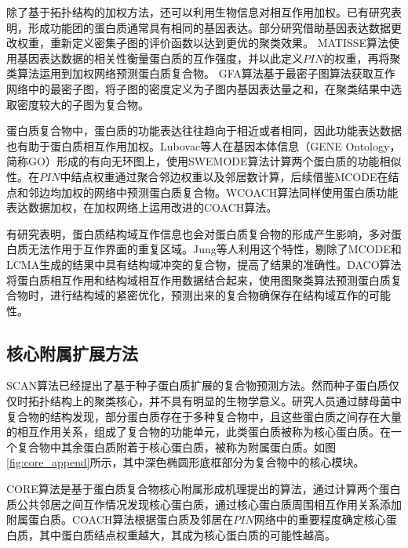 除了基于拓扑结构的加权方法，还可以利用生物信息对相互作用加权。已有研究表明\cite{komurov_revealing_2007}，形成功能团的蛋白质通常具有相同的基因表达。部分研究借助基因表达数据更改权重，重新定义密集子图的评价函数以达到更优的聚类效果。
MATISSE算法\cite{ulitsky_identification_2007}使用基因表达数据的相关性衡量蛋白质的互作强度，并以此定义$PIN$的权重，再将聚类算法运用到加权网络预测蛋白质复合物。
GFA算法\cite{jianxing_feng_max-flow-based_2011}基于最密子图算法获取互作网络中的最密子图，将子图的密度定义为子图内基因表达量之和，在聚类结果中选取密度较大的子图为复合物。

蛋白质复合物中，蛋白质的功能表达往往趋向于相近或者相同，因此功能表达数据也有助于蛋白质相互作用加权。Lubovac等人\cite{lubovac_combining_2006}在基因本体信息\cite{ashburner_gene_2000}（GENE Ontology，简称GO）形成的有向无环图上，使用SWEMODE算法计算两个蛋白质的功能相似性。在$PIN$中结点权重通过聚合邻边权重以及邻居数计算，后续借鉴MCODE在结点和邻边均加权的网络中预测蛋白质复合物。WCOACH算法\cite{kouhsar_wcoach_2016}同样使用蛋白质功能表达数据加权，在加权网络上运用改进的COACH算法\cite{leung_predicting_2009}。

有研究表明，蛋白质结构域互作信息也会对蛋白质复合物的形成产生影响\cite{kim_relating_2006}，多对蛋白质无法作用于互作界面的重复区域。Jung等人\cite{jung_protein_2008}利用这个特性，剔除了MCODE和LCMA生成的结果中具有结构域冲突的复合物，提高了结果的准确性。DACO算法\cite{will_identifying_2014}将蛋白质相互作用和结构域相互作用数据结合起来，使用图聚类算法预测蛋白质复合物时，进行结构域的紧密优化，预测出来的复合物确保存在结构域互作的可能性。


\subsection{核心附属扩展方法}
\label{subsection:research:CoreAppend}

SCAN算法\cite{mete_structural_2008}已经提出了基于种子蛋白质扩展的复合物预测方法。然而种子蛋白质仅仅时拓扑结构上的聚类核心，并不具有明显的生物学意义。研究人员\cite{gavin_proteome_2006}通过酵母菌中复合物的结构发现，部分蛋白质存在于多种复合物中，且这些蛋白质之间存在大量的相互作用关系，组成了复合物的功能单元，此类蛋白质被称为核心蛋白质。在一个复合物中其余蛋白质附着于核心蛋白质，被称为附属蛋白质。如图\ref{fig:core_append}所示，其中深色椭圆形底框部分为复合物中的核心模块。

CORE算法\cite{leung_predicting_2009}是基于蛋白质复合物核心附属形成机理提出的算法，通过计算两个蛋白质公共邻居之间互作情况发现核心蛋白质，通过核心蛋白质周围相互作用关系添加附属蛋白质。COACH算法\cite{leung_predicting_2009}根据蛋白质及邻居在$PIN$网络中的重要程度确定核心蛋白质，其中蛋白质结点权重越大，其成为核心蛋白质的可能性越高。

